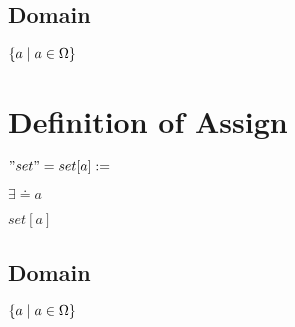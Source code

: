 \documentclass[11pt]{article}
\begin{document}
\subsection{Domain}
\begin{center}
$
\{ a \hspace{1mm} | \hspace{1mm} a \in \Omega\}
$
\end{center}



\section{Definition of Assign}
\begin{center}
$
"set" = set[a] :=
$
\end{center}
\vspace{1mm}
$\exists \doteq a$
\begin{center}
$
set[a]
$
\end{center}
\subsection{Domain}
\begin{center}
$
\{ a \hspace{1mm} | \hspace{1mm} a \in \Omega\}
$
\end{center}




\end{document}
